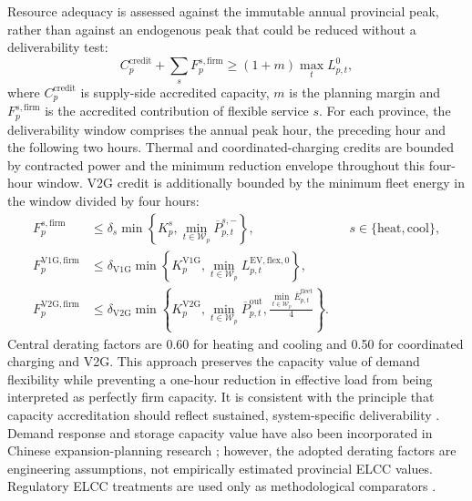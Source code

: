\documentclass[12pt]{article}
\begin{document}
Resource adequacy is assessed against the immutable annual provincial peak,
rather than against an endogenous peak that could be reduced without a
deliverability test:
\begin{equation}
  C^{\mathrm{credit}}_p
  +\sum_s F^{s,\mathrm{firm}}_p
  \ge
  (1+m)\max_t L^{0}_{p,t},
  \label{eq:adequacy}
\end{equation}
where $C^{\mathrm{credit}}_p$ is supply-side accredited capacity, $m$ is the
planning margin and $F^{s,\mathrm{firm}}_p$ is the accredited contribution of
flexible service $s$. For each province, the deliverability window comprises
the annual peak hour, the preceding hour and the following two hours. Thermal
and coordinated-charging credits are bounded by contracted power and the
minimum reduction envelope throughout this four-hour window. V2G credit is
additionally bounded by the minimum fleet energy in the window divided by
four hours:
\begin{align}
 F^{s,\mathrm{firm}}_p
 &\le
 \delta_s\min\left\{
 K^s_p,\min_{t\in\mathcal W_p}\overline P^{s,-}_{p,t}
 \right\},
 &&s\in\{\mathrm{heat},\mathrm{cool}\},\\
 F^{\mathrm{V1G},\mathrm{firm}}_p
 &\le
 \delta_{\mathrm{V1G}}\min\left\{
 K^{\mathrm{V1G}}_p,
 \min_{t\in\mathcal W_p}L^{\mathrm{EV,flex},0}_{p,t}
 \right\},\\
 F^{\mathrm{V2G},\mathrm{firm}}_p
 &\le
 \delta_{\mathrm{V2G}}\min\left\{
 K^{\mathrm{V2G}}_p,
 \min_{t\in\mathcal W_p}\overline P^{\mathrm{out}}_{p,t},
 \frac{\min_{t\in\mathcal W_p}\overline E^{\mathrm{fleet}}_{p,t}}{4}
 \right\}.
  \label{eq:firmcredit}
\end{align}
Central derating factors are 0.60 for heating and cooling and 0.50 for
coordinated charging and V2G. This approach preserves the capacity value of
demand flexibility while preventing a one-hour reduction in effective load
from being interpreted as perfectly firm capacity. It is consistent with the
principle that capacity accreditation should reflect sustained,
system-specific deliverability
\cite{NREL2024RA,ESIG2023Capacity,Mantegna2024RA}. Demand response and storage
capacity value have also been incorporated in Chinese expansion-planning
research \cite{Huang2023DRCapacity}; however, the adopted derating factors are
engineering assumptions, not empirically estimated provincial ELCC values.
Regulatory ELCC treatments are used only as methodological comparators
\cite{CPUC2026IRP}.
\end{document}

